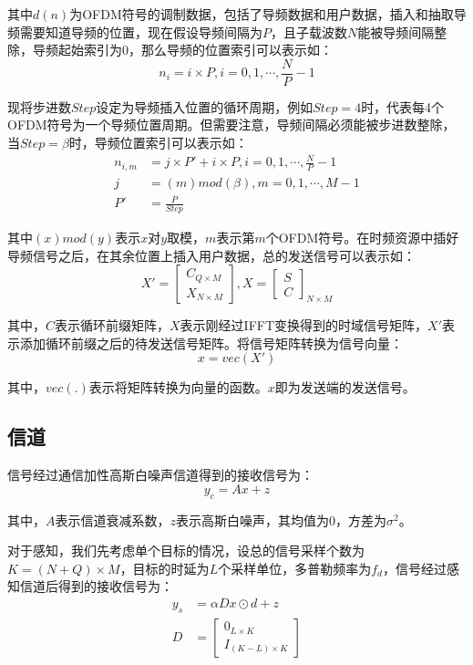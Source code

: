 \documentclass[12pt, a4paper, oneside]{ctexart}
\begin{document}
其中$d(n)$为OFDM符号的调制数据，包括了导频数据和用户数据，插入和抽取导频需要知道导频的位置，现在假设导频间隔为$P$，且子载波数$N$能被导频间隔整除，导频起始索引为0，那么导频的位置索引可以表示如：
\[
    n_i = i\times P,i=0,1,\cdots,\frac{N}{P}-1
\]

现将步进数$Step$设定为导频插入位置的循环周期，例如$Step=4$时，代表每4个OFDM符号为一个导频位置周期。但需要注意，导频间隔必须能被步进数整除，当$Step=\beta$时，导频位置索引可以表示如：
\begin{align}
    n_{i,m}&=j\times P'+i\times P,i=0,1,\cdots,\frac{N}{P}-1 \\
    j&=(m)mod(\beta),m=0,1,\cdots,M-1 \\
    P'&=\frac{P}{Step}
\end{align}

其中$(x)mod(y)$表示$x$对$y$取模，$m$表示第$m$个OFDM符号。在时频资源中插好导频信号之后，在其余位置上插入用户数据，总的发送信号可以表示如：
$$
X'=\begin{bmatrix}
    C_{Q\times M} \\
    X_{N\times M}
\end{bmatrix},X=\begin{bmatrix}
    S \\
    C
\end{bmatrix}_{N\times M}
$$

其中，$C$表示循环前缀矩阵，$X$表示刚经过IFFT变换得到的时域信号矩阵，$X'$表示添加循环前缀之后的待发送信号矩阵。将信号矩阵转换为信号向量：
$$
x=vec(X')
$$

其中，$vec(.)$表示将矩阵转换为向量的函数。$x$即为发送端的发送信号。
\subsection*{\heiti{} 信道}
信号经过通信加性高斯白噪声信道得到的接收信号为：
$$
y_c=Ax+z
$$

其中，$A$表示信道衰减系数，$z$表示高斯白噪声，其均值为0，方差为$\sigma^2$。

对于感知，我们先考虑单个目标的情况，设总的信号采样个数为$K=(N+Q)\times M$，目标的时延为$L$个采样单位，多普勒频率为$f_d$，信号经过感知信道后得到的接收信号为：
$$
\begin{aligned}
y_s&=\alpha Dx\odot d+z \\
D&=\begin{bmatrix}
    0_{L\times K} \\
    I_{(K-L)\times K}
\end{bmatrix}
\end{aligned}
$$
\end{document}
